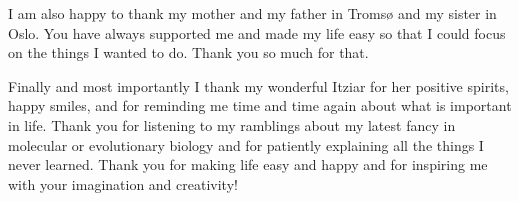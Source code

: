 I am also happy to thank my mother and my father in Tromsø and my sister in
Oslo. You have always supported me and made my life easy so that I could focus
on the things I wanted to do. Thank you so much for that.

Finally and most importantly I thank my wonderful Itziar for her positive
spirits, happy smiles, and for reminding me time and time again about what is
important in life. Thank you for listening to my ramblings about my latest
fancy in molecular or evolutionary biology and for patiently explaining all the
things I never learned. Thank you for making life easy and happy and for
inspiring me with your imagination and creativity!
